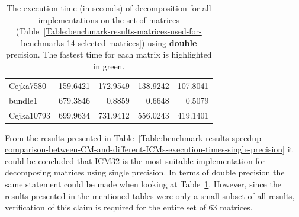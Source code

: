 \begin{table}[h!]
\begin{tabular}{|>{\footnotesize}l|>{\raggedleft\arraybackslash\footnotesize}r|>{\raggedleft\arraybackslash\footnotesize}r|>{\raggedleft\arraybackslash\footnotesize}r|>{\raggedleft\arraybackslash\footnotesize}r|}
		Cejka7580		&                   159.6421 &                   172.9549 &                   138.9242 & \cellcolor{green!25}107.8041 \\
		bundle1         &                   679.3846 &                     0.8859 &                     0.6648 & \cellcolor{green!25}  0.5079 \\
		Cejka10793      &                   699.9634 &                   731.9412 &                   556.0243 & \cellcolor{green!25}419.1401 \\ \hline
	\end{tabular}
	\caption{The execution time (in seconds) of decomposition for all implementations on the set of matrices (Table~\ref{Table:benchmark-results-matrices-used-for-benchmarks-14-selected-matrices}) using \textbf{double} precision. The fastest time for each matrix is highlighted in green.}
	\label{Table:benchmark-results-speedup-comparison-between-CM-and-different-ICMs-execution-times-double-precision}
\end{table}

From the results presented in Table~\ref{Table:benchmark-results-speedup-comparison-between-CM-and-different-ICMs-execution-times-single-precision} it could be concluded that ICM32 is the most suitable implementation for decomposing matrices using single precision. In terms of double precision the same statement could be made when looking at Table~\ref{Table:benchmark-results-speedup-comparison-between-CM-and-different-ICMs-execution-times-double-precision}. However, since the results presented in the mentioned tables were only a small subset of all results, verification of this claim is required for the entire set of $ 63 $ matrices.

